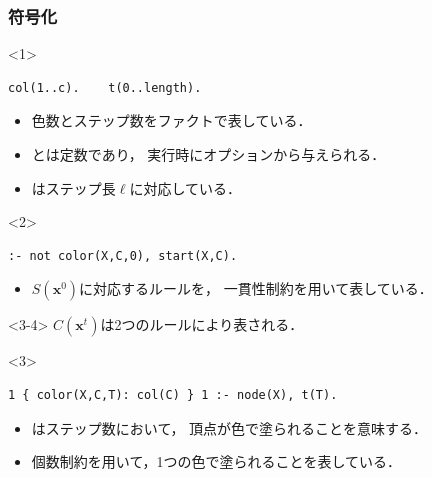 \documentclass[dvipdfmx,11pt]{beamer}
\begin{document}
\begin{frame}[fragile]\frametitle{符号化}
  \begin{exampleblock}{}
    \centering
    
  \end{exampleblock}

  \begin{onlyenv}<1>
    \begin{exampleblock}{}
      \begin{lstlisting}
col(1..c).    t(0..length).
      \end{lstlisting}
    \end{exampleblock}
    \begin{itemize}
      \item 色数とステップ数をファクトで表している．
      \item {}とは定数であり，
            実行時にオプションから与えられる．
      \item {}はステップ長$\ell$に対応している．
    \end{itemize}
  \end{onlyenv}

  \begin{onlyenv}<2>
    \begin{exampleblock}{}
      \centering
      \begin{lstlisting}
:- not color(X,C,0), start(X,C).
      \end{lstlisting}
    \end{exampleblock}
    \begin{itemize}
      \item $S(\bm{x}^0)$に対応するルールを，
            一貫性制約を用いて表している．
    \end{itemize}
  \end{onlyenv}

  \begin{onlyenv}<3-4>
    $C(\bm{x}^t)$は2つのルールにより表される．
  \end{onlyenv}

  \begin{onlyenv}<3>
    \begin{exampleblock}{}
      \begin{lstlisting}
1 { color(X,C,T): col(C) } 1 :- node(X), t(T).
      \end{lstlisting}
    \end{exampleblock}
    \begin{itemize}
      \item {}はステップ数において，
            頂点が色で塗られることを意味する．
      \item 個数制約を用いて，1つの色で塗られることを表している．
    \end{itemize}
  \end{onlyenv}


\end{frame}
\end{document}

